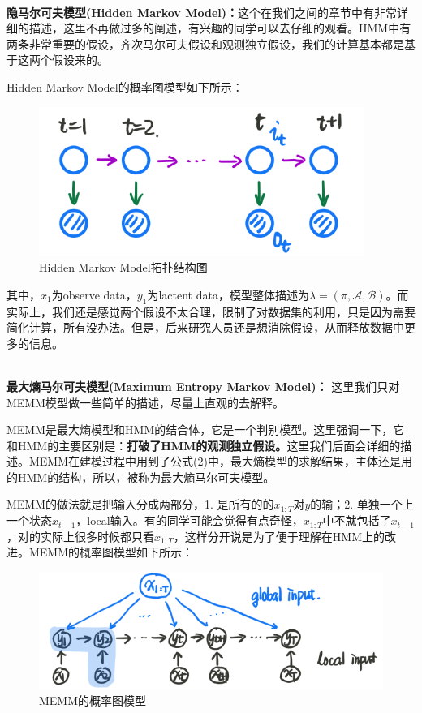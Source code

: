 \documentclass[a4paper]{article}
\begin{document}
~\\
\textbf{隐马尔可夫模型(Hidden Markov Model)：}这个在我们之间的章节中有非常详细的描述，这里不再做过多的阐述，有兴趣的同学可以去仔细的观看。HMM中有两条非常重要的假设，齐次马尔可夫假设和观测独立假设，我们的计算基本都是基于这两个假设来的。

Hidden Markov Model的概率图模型如下所示：
\begin{figure}[H]
    \centering
    \includegraphics[width=.45\textwidth]{微信图片_20200107213811.png}
    \caption{Hidden Markov Model拓扑结构图}
    \label{fig:my_label_1}
\end{figure}
其中，$x_1$为observe data，$y_1$为lactent data，模型整体描述为$\lambda = (\pi,\mathcal{A},\mathcal{B})$。而实际上，我们还是感觉两个假设不太合理，限制了对数据集的利用，只是因为需要简化计算，所有没办法。但是，后来研究人员还是想消除假设，从而释放数据中更多的信息。

~\\
\textbf{最大熵马尔可夫模型(Maximum Entropy Markov Model)：}
这里我们只对MEMM模型做一些简单的描述，尽量上直观的去解释。

MEMM是最大熵模型和HMM的结合体，它是一个判别模型。这里强调一下，它和HMM的主要区别是：\textbf{打破了HMM的观测独立假设。}这里我们后面会详细的描述。MEMM在建模过程中用到了公式(2)中，最大熵模型的求解结果，主体还是用的HMM的结构，所以，被称为最大熵马尔可夫模型。

MEMM的做法就是把输入分成两部分，1. 是所有的的$x_{1:T}$对$y$的输；2. 单独一个上一个状态$x_{t-1}$，local输入。有的同学可能会觉得有点奇怪，$x_{1:T}$中不就包括了$x_{t-1}$，对的实际上很多时候都只看$x_{1:T}$，这样分开说是为了便于理解在HMM上的改进。MEMM的概率图模型如下所示：
\begin{figure}[H]
    \centering
    \includegraphics[width=.65\textwidth]{微信图片_20200221182717.png}
    \caption{MEMM的概率图模型}
    \label{fig:my_label_1}
\end{figure}
\end{document}
